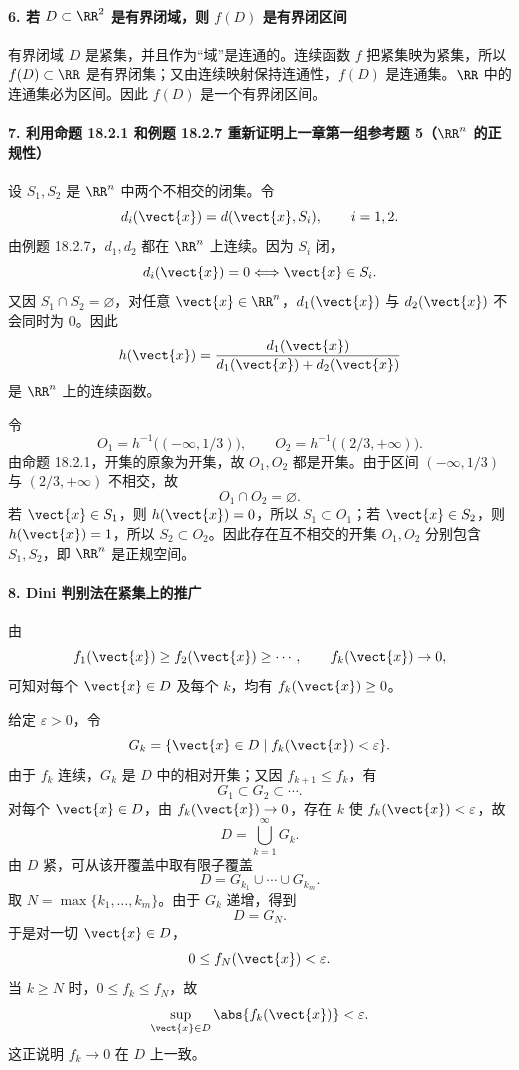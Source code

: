 \paragraph{6. 若 $D\subset\RR^2$ 是有界闭域，则 $f(D)$ 是有界闭区间}
\begin{xsolution}
有界闭域 $D$ 是紧集，并且作为“域”是连通的。连续函数 $f$ 把紧集映为紧集，所以 $f(D)\subset\RR$ 是有界闭集；又由连续映射保持连通性，$f(D)$ 是连通集。$\RR$ 中的连通集必为区间。因此 $f(D)$ 是一个有界闭区间。
\end{xsolution}

\paragraph{7. 利用命题 18.2.1 和例题 18.2.7 重新证明上一章第一组参考题 5（$\RR^n$ 的正规性）}
\begin{xsolution}
设 $S_1,S_2$ 是 $\RR^n$ 中两个不相交的闭集。令
\[
  d_i(\vect{x})=d(\vect{x},S_i),
  \qquad i=1,2.
\]
由例题 18.2.7，$d_1,d_2$ 都在 $\RR^n$ 上连续。因为 $S_i$ 闭，
\[
  d_i(\vect{x})=0
  \Longleftrightarrow
  \vect{x}\in S_i.
\]
又因 $S_1\cap S_2=\varnothing$，对任意 $\vect{x}\in\RR^n$，$d_1(\vect{x})$ 与 $d_2(\vect{x})$ 不会同时为 $0$。因此
\[
  h(\vect{x})
  =\frac{d_1(\vect{x})}{d_1(\vect{x})+d_2(\vect{x})}
\]
是 $\RR^n$ 上的连续函数。

令
\[
  O_1=h^{-1}\bigl((-\infty,1/3)\bigr),
  \qquad
  O_2=h^{-1}\bigl((2/3,+\infty)\bigr).
\]
由命题 18.2.1，开集的原象为开集，故 $O_1,O_2$ 都是开集。由于区间 $(-\infty,1/3)$ 与 $(2/3,+\infty)$ 不相交，故
\[
  O_1\cap O_2=\varnothing.
\]
若 $\vect{x}\in S_1$，则 $h(\vect{x})=0$，所以 $S_1\subset O_1$；若 $\vect{x}\in S_2$，则 $h(\vect{x})=1$，所以 $S_2\subset O_2$。因此存在互不相交的开集 $O_1,O_2$ 分别包含 $S_1,S_2$，即 $\RR^n$ 是正规空间。
\end{xsolution}

\paragraph{8. Dini 判别法在紧集上的推广}
\begin{xsolution}
由
\[
  f_1(\vect{x})\ge f_2(\vect{x})\ge\cdots,
  \qquad
  f_k(\vect{x})\to0,
\]
可知对每个 $\vect{x}\in D$ 及每个 $k$，均有 $f_k(\vect{x})\ge0$。

给定 $\varepsilon>0$，令
\[
  G_k=\{\vect{x}\in D\mid f_k(\vect{x})<\varepsilon\}.
\]
由于 $f_k$ 连续，$G_k$ 是 $D$ 中的相对开集；又因 $f_{k+1}\le f_k$，有
\[
  G_1\subset G_2\subset\cdots.
\]
对每个 $\vect{x}\in D$，由 $f_k(\vect{x})\to0$，存在 $k$ 使 $f_k(\vect{x})<\varepsilon$，故
\[
  D=\bigcup_{k=1}^\infty G_k.
\]
由 $D$ 紧，可从该开覆盖中取有限子覆盖
\[
  D=G_{k_1}\cup\cdots\cup G_{k_m}.
\]
取 $N=\max\{k_1,\ldots,k_m\}$。由于 $G_k$ 递增，得到
\[
  D=G_N.
\]
于是对一切 $\vect{x}\in D$，
\[
  0\le f_N(\vect{x})<\varepsilon.
\]
当 $k\ge N$ 时，$0\le f_k\le f_N$，故
\[
  \sup_{\vect{x}\in D}\abs{f_k(\vect{x})}<\varepsilon.
\]
这正说明 $f_k\to0$ 在 $D$ 上一致。
\end{xsolution}

